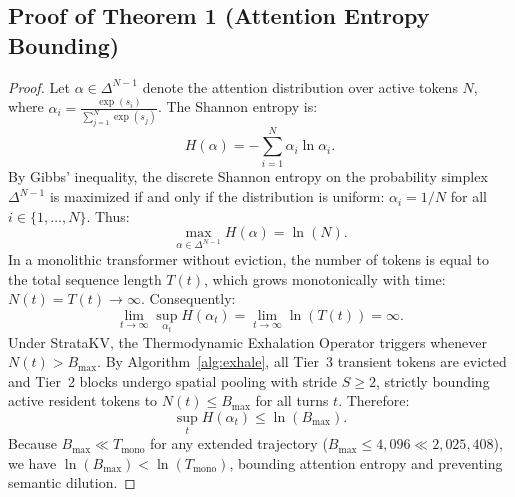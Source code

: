 \documentclass[11pt,letterpaper]{article}
\theoremstyle{definition}
\begin{document}
\subsection{Proof of Theorem 1 (Attention Entropy Bounding)}
\begin{proof}
Let $\alpha \in \Delta^{N-1}$ denote the attention distribution over active tokens $N$, where $\alpha_i = \frac{\exp(s_i)}{\sum_{j=1}^N \exp(s_j)}$. The Shannon entropy is:
$$H(\alpha) = -\sum_{i=1}^N \alpha_i \ln \alpha_i.$$
By Gibbs' inequality, the discrete Shannon entropy on the probability simplex $\Delta^{N-1}$ is maximized if and only if the distribution is uniform: $\alpha_i = 1/N$ for all $i \in \{1, \dots, N\}$. Thus:
$$\max_{\alpha \in \Delta^{N-1}} H(\alpha) = \ln(N).$$
In a monolithic transformer without eviction, the number of tokens is equal to the total sequence length $T(t)$, which grows monotonically with time: $N(t) = T(t) \to \infty$. Consequently:
$$\lim_{t \to \infty} \sup_{\alpha_t} H(\alpha_t) = \lim_{t \to \infty} \ln(T(t)) = \infty.$$
Under StrataKV, the Thermodynamic Exhalation Operator triggers whenever $N(t) > B_{\text{max}}$. By Algorithm~\ref{alg:exhale}, all Tier~3 transient tokens are evicted and Tier~2 blocks undergo spatial pooling with stride $S \ge 2$, strictly bounding active resident tokens to $N(t) \le B_{\text{max}}$ for all turns $t$. Therefore:
$$\sup_t H(\alpha_t) \le \ln(B_{\text{max}}).$$
Because $B_{\text{max}} \ll T_{\text{mono}}$ for any extended trajectory ($B_{\text{max}} \le 4,096 \ll 2,025,408$), we have $\ln(B_{\text{max}}) < \ln(T_{\text{mono}})$, bounding attention entropy and preventing semantic dilution.
\end{proof}
\end{document}
